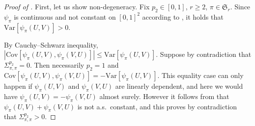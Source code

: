 \documentclass{article}
\theoremstyle{remark}
\newcommand{\card}[1]{\left|#1\right|}
\newcommand{\var}[1]{\mathrm{Var}\left[#1\right]}
\newcommand{\cov}[2]{\mathrm{Cov}\left[#1,#2\right]}
\def\S{\mathfrak{S}}
\def\carre{[0,1]^2}
\begin{document}
\begin{proof}[Proof of ]
    First, let us show non-degeneracy.
    Fix $p_2\in[0,1]$, $r\ge2$, $\pi\in\S_r$.
    Since $\psi_\pi$ is continuous and not constant on $\carre$ according to , it holds that $\var{\psi_\pi(U,V)}>0$.
    
    By Cauchy--Schwarz inequality, $\card{\cov{\psi_\pi(U,V)}{\psi_\pi(V,U)}} \le \var{\psi_\pi(U,V)}$.
    Suppose by contradiction that $\Sigma_{\pi,\pi}^{p_2}=0$. 
    Then necessarily $p_2=1$ and $\cov{\psi_\pi(U,V)}{\psi_\pi(V,U)} = -\var{\psi_\pi(U,V)}$.
    This equality case can only happen if $\psi_\pi(U,V)$ and $\psi_\pi(V,U)$ are linearly dependent, and here we would have $\psi_\pi(U,V)=-\psi_\pi(V,U)$ almost surely.
    However it follows from  that $\psi_\pi(U,V)+\psi_\pi(V,U)$ is not a.s.~constant, and this proves by contradiction that $\Sigma_{\pi,\pi}^{p_2}>0$.
    

\end{proof}
\end{document}

